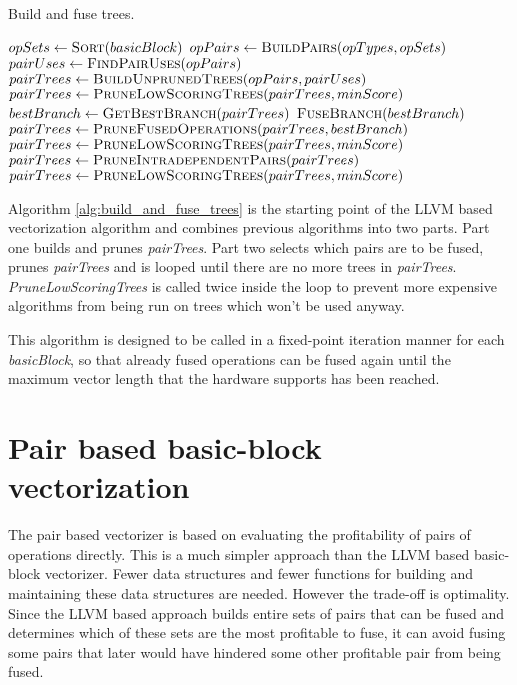 \documentclass[12pt,a4paper,onecolumn,twoside,openright]{report}
\begin{document}
\begin{algorithm}[H]
	\caption{Build and fuse trees.} \label{alg:build_and_fuse_trees}
	\small
	\begin{algorithmic}
		\State $opSets \gets \Call{Sort}{basicBlock}$
		\State $opPairs \gets \Call{BuildPairs}{opTypes, opSets}$
		\State $pairUses \gets \Call{FindPairUses}{opPairs}$
		\State $pairTrees \gets \Call{BuildUnprunedTrees}{opPairs, pairUses}$
		\State $pairTrees \gets \Call{PruneLowScoringTrees}{pairTrees, minScore}$
		\State %
			\State $bestBranch \gets \Call{GetBestBranch}{pairTrees}$
			\State $\Call{FuseBranch}{bestBranch}$
			\State $pairTrees \gets \Call{PruneFusedOperations}{pairTrees, bestBranch}$
			\State $pairTrees \gets \Call{PruneLowScoringTrees}{pairTrees, minScore}$
			\State $pairTrees \gets \Call{PruneIntradependentPairs}{pairTrees}$
			\State $pairTrees \gets \Call{PruneLowScoringTrees}{pairTrees, minScore}$
		\EndWhile
	\EndFunction
	\end{algorithmic}
\end{algorithm}
Algorithm \ref{alg:build_and_fuse_trees} is the starting point of the LLVM based vectorization algorithm and combines previous algorithms into two parts. Part one builds and prunes \textit{pairTrees}. Part two selects which pairs are to be fused, prunes \textit{pairTrees} and is looped until there are no more trees in \textit{pairTrees}. \textit{PruneLowScoringTrees} is called twice inside the loop to prevent more expensive algorithms from being run on trees which won't be used anyway.

This algorithm is designed to be called in a fixed-point iteration manner for each \textit{basicBlock}, so that already fused operations can be fused again until the maximum vector length that the hardware supports has been reached.


\section{Pair based basic-block vectorization}
The pair based vectorizer is based on evaluating the profitability of pairs of operations directly. This is a much simpler approach than the LLVM based basic-block vectorizer. Fewer data structures and fewer functions for building and maintaining these data structures are needed. However the trade-off is optimality. Since the LLVM based approach builds entire sets of pairs that can be fused and determines which of these sets are the most profitable to fuse, it can avoid fusing some pairs that later would have hindered some other profitable pair from being fused.
\\
\end{document}

